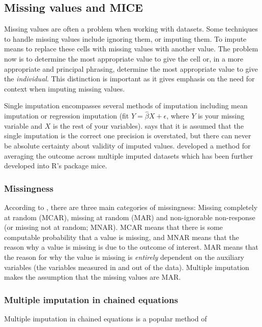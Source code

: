 \documentclass[12pt]{article}
\begin{document}
\subsection{Missing values and MICE}
		
		Missing values are often a problem when working with datasets. Some techniques to handle missing values include ignoring them, or imputing them. To impute means to replace these cells with missing values with another value. The problem now is to determine the most appropriate value to give the cell or, in a more appropriate and principal phrasing, determine the most appropriate value to give the \emph{individual}. This distinction is important as it gives emphasis on the need for context when imputing missing values.
		
		Single imputation encompasses several methods of imputation including mean imputation or regression imputation (fit $Y= \widehat\beta X + \epsilon$, where $Y$ is your missing variable and $X$ is the rest of your variables). \cite{jadhav1} says that it is assumed that the single imputation is the correct one precision is overstated, but there can never be absolute certainty about validity of imputed values. \cite{rubin1} developed a method for averaging the outcome across multiple imputed datasets which has been further developed into \textsf{R}'s package \textsf{mice}.
		
\subsubsection{Missingness}

According to \cite{rarnorld1}, there are three main categories of missingness: Missing completely at random (MCAR), missing at random (MAR) and non-ignorable non-response (or missing not at random; MNAR). MCAR means that there is some computable probability that a value is missing, and MNAR means that the reason why a value is missing is due to the outcome of interest. MAR means that the reason for why the value is missing is \emph{entirely} dependent on the auxiliary variables (the variables measured in and out of the data). Multiple imputation makes the assumption that the missing values are MAR.

\subsubsection{Multiple imputation in chained equations}
		
		Multiple imputation in chained equations is a popular method of 
\end{document}

